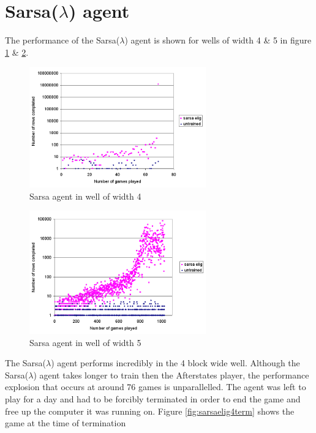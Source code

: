 \documentclass{rucsthesis}
\begin{document}
\section{Sarsa($\lambda$) agent}

The performance of the Sarsa($\lambda$) agent is shown for wells of width 4 \& 5 in figure \ref{fig:sarsaeligredtet4well} \& \ref{fig:sarsaeligredtet5well}.

\begin{figure}[h]
\centering
\includegraphics[width=3in]{sarsaeligredtet4well.png}
\caption{Sarsa agent in well of width 4}
\label{fig:sarsaeligredtet4well}
\end{figure}

\begin{figure}[h]
\centering
\includegraphics[width=3in]{sarsaeligredtet5well.png}
\caption{Sarsa agent in well of width 5}
\label{fig:sarsaeligredtet5well}
\end{figure}

The Sarsa($\lambda$) agent performs incredibly in the 4 block wide well. Although the Sarsa($\lambda$) agent takes longer to train then the Afterstates player, the performance explosion that occurs at around 76 games is unparallelled. The agent was left to play for a day and had to be forcibly terminated in order to end the game and free up the computer it was running on. Figure \ref{fig:sarsaelig4term} shows the game at the time of termination 
\end{document}
